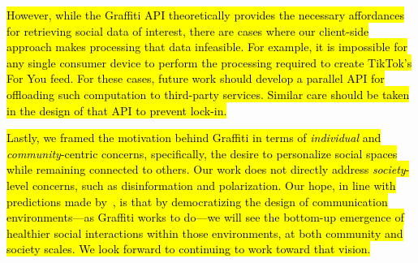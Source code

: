 {\hl{%
However, while the Graffiti API theoretically provides the necessary
affordances for retrieving social data of interest,
there are cases where our client-side
approach makes processing that data infeasible.
For example, it is impossible for any single consumer device to
perform the processing required to create TikTok's For You feed.
For these cases, future work should develop
a parallel API for offloading such
computation to third-party services.
Similar care should be taken
in the design of that API to prevent lock-in.
}}%

{\hl{%
Lastly, we framed the motivation behind Graffiti in terms of
\emph{individual} and \emph{community}-centric concerns,
specifically, the desire to personalize social spaces while remaining connected to others.
Our work does not directly address \emph{society}-level concerns,
such as disinformation and polarization.
Our hope, in line with predictions made by~{\cite{threeleggedstool}}, is that by democratizing
the design of communication environments---as Graffiti works to do---we
will see the bottom-up emergence of healthier social interactions within those environments,
at both community and society scales.
We look forward to continuing to work toward that vision.
}}%













